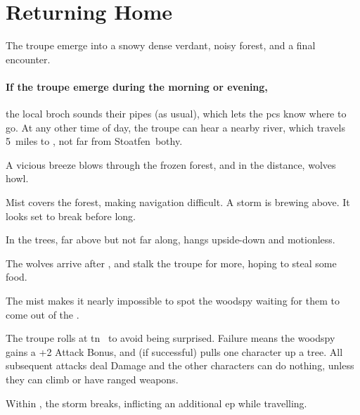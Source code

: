 \section{Returning Home}

\begin{multicols}{2}
\renewcommand\npcsymbol{\gls{evening}}

\noindent
The troupe emerge into a
\ifcase\value{temperature}%
  snowy
\or%
  dense 
\else%
  verdant, noisy 
\fi%
forest, and a final encounter.

\paragraph{If the troupe emerge during the morning or evening,}
the local \gls{broch} sounds their pipes (as usual), which lets the \glspl{pc} know where to go.
At any other time of day, the troupe can hear a nearby river, which travels 5~miles to , not far from Stoatfen~\Gls{bothy}.

\begin{boxtext}
  \ifcase\value{temperature}
    A vicious breeze blows through the frozen forest, and in the distance, wolves howl.

    \or
    Mist covers the forest, making navigation difficult.
    \else
    A storm is brewing above.
    It looks set to break before long.

    In the trees, far above but not far along,  hangs upside-down and motionless.

    \chitincrawler
  \fi
\end{boxtext}

\ifcase\value{temperature}
  The wolves arrive after , and stalk the troupe for  more, hoping to steal some food.

  \wolf
  \or
  The mist makes it nearly impossible to spot the \gls{woodspy} waiting for them to come out of the .

  \woodspy

  \addtocounter{tn}{\value{Dexterity}}
  \addtocounter{tn}{\value{Stealth}}
  The troupe rolls  at \gls{tn}~ to avoid being surprised.
  Failure means the \gls{woodspy} gains a +2 Attack Bonus, and (if successful) pulls one character up a tree.
  All subsequent attacks deal Damage and the other characters can do nothing, unless they can climb or have ranged weapons.

  \else
  Within , the storm breaks, inflicting an additional \gls{ep} while travelling.


\end{multicols}
